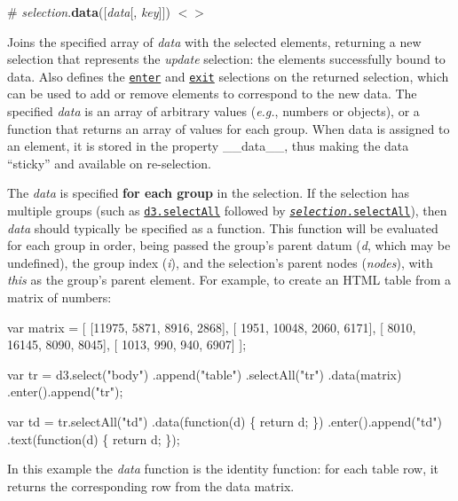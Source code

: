 \label{_selection_data}%
\# {\itshape selection}.{\bfseries data}(\mbox{[}{\itshape data}\mbox{[}, {\itshape key}\mbox{]}\mbox{]}) \href{https://github.com/d3/d3-selection/blob/master/src/selection/data.js}{\tt $<$$>$}

Joins the specified array of {\itshape data} with the selected elements, returning a new selection that represents the {\itshape update} selection\+: the elements successfully bound to data. Also defines the \href{#selection_enter}{\tt enter} and \href{#selection_exit}{\tt exit} selections on the returned selection, which can be used to add or remove elements to correspond to the new data. The specified {\itshape data} is an array of arbitrary values ({\itshape e.\+g.}, numbers or objects), or a function that returns an array of values for each group. When data is assigned to an element, it is stored in the property {\ttfamily \+\_\+\+\_\+data\+\_\+\+\_\+}, thus making the data “sticky” and available on re-\/selection.

The {\itshape data} is specified {\bfseries for each group} in the selection. If the selection has multiple groups (such as \href{#selectAll}{\tt d3.\+select\+All} followed by \href{#selection_selectAll}{\tt {\itshape selection}.select\+All}), then {\itshape data} should typically be specified as a function. This function will be evaluated for each group in order, being passed the group’s parent datum ({\itshape d}, which may be undefined), the group index ({\itshape i}), and the selection’s parent nodes ({\itshape nodes}), with {\itshape this} as the group’s parent element. For example, to create an H\+T\+ML table from a matrix of numbers\+:


\begin{DoxyCode}
var matrix = [
  [11975,  5871, 8916, 2868],
  [ 1951, 10048, 2060, 6171],
  [ 8010, 16145, 8090, 8045],
  [ 1013,   990,  940, 6907]
];

var tr = d3.select("body")
  .append("table")
  .selectAll("tr")
  .data(matrix)
  .enter().append("tr");

var td = tr.selectAll("td")
  .data(function(d) \{ return d; \})
  .enter().append("td")
    .text(function(d) \{ return d; \});
\end{DoxyCode}


In this example the {\itshape data} function is the identity function\+: for each table row, it returns the corresponding row from the data matrix.

